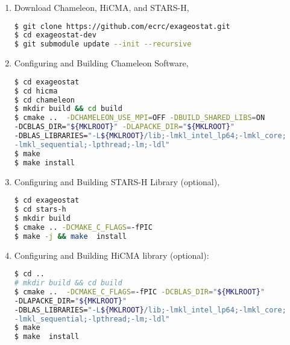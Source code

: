 \documentclass[
10pt, %
a4paper, %
oneside, %
headinclude,footinclude, %
BCOR5mm, %
]{scrartcl}
\begin{document}
\begin{enumerate}
%


\item
\noindent Download Chameleon, HiCMA, and STARS-H,
\begin{lstlisting}[language=bash]
$ git clone https://github.com/ecrc/exageostat.git
$ cd exageostat-dev
$ git submodule update --init --recursive
\end{lstlisting}

\item
\noindent Configuring and Building Chameleon Software,
\begin{lstlisting}[language=bash]
$ cd exageostat
$ cd hicma
$ cd chameleon
$ mkdir build && cd build
$ cmake ..  -DCHAMELEON_USE_MPI=OFF -DBUILD_SHARED_LIBS=ON 
-DCBLAS_DIR="${MKLROOT}" -DLAPACKE_DIR="${MKLROOT}"
-DBLAS_LIBRARIES="-L${MKLROOT}/lib;-lmkl_intel_lp64;-lmkl_core; 
-lmkl_sequential;-lpthread;-lm;-ldl"
$ make 
$ make install
\end{lstlisting}


\item
\noindent Configuring and Building STARS-H Library (optional),
\begin{lstlisting}[language=bash]
$ cd exageostat
$ cd stars-h
$ mkdir build 
$ cmake .. -DCMAKE_C_FLAGS=-fPIC 
$ make -j && make  install
\end{lstlisting}



\item
\noindent Configuring and Building HiCMA library (optional):
\begin{lstlisting}[language=bash]
$ cd ..
# mkdir build && cd build
$ cmake ..  -DCMAKE_C_FLAGS=-fPIC -DCBLAS_DIR="${MKLROOT}" 
-DLAPACKE_DIR="${MKLROOT}"
-DBLAS_LIBRARIES="-L${MKLROOT}/lib;-lmkl_intel_lp64;-lmkl_core;
-lmkl_sequential;-lpthread;-lm;-ldl"
$ make 
$ make  install
\end{lstlisting}
\end{enumerate}
\end{document}
